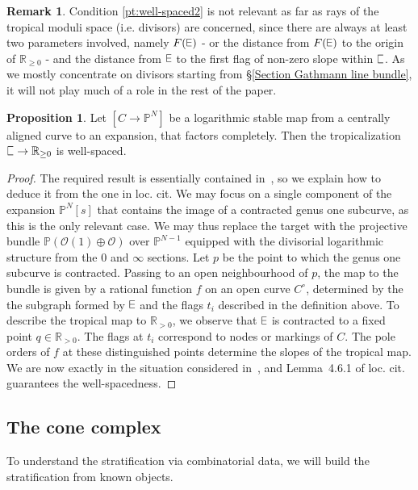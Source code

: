 \documentclass[11pt]{amsart}
\DeclareRobustCommand{\plE}{\text{\reflectbox{$\exists$}}}
\newcommand{\plC}{\scalebox{0.8}[1.3]{$\sqsubset$}}
\renewcommand{\to}{\rightarrow}
\newcommand{\RR}{\mathbb{R}}
\theoremstyle{definition}
\newtheorem{prop}[thm]{Proposition}
\theoremstyle{definition}
\newtheorem*{rem}{Remark}
\begin{document}
\begin{rem}
Condition \eqref{pt:well-spaced2} is not relevant as far as rays of the tropical moduli space (i.e. divisors) are concerned, since there are always at least two parameters involved, namely $F(\plE)$ - or the distance from $F(\plE)$ to the origin of $\RR_{\geq 0}$ - and the distance from $\plE$ to the first flag of non-zero slope within $\plC$. As we mostly concentrate on divisors starting from \S \ref{Section Gathmann line bundle}, it will not play much of a role in the rest of the paper.
\end{rem}

\begin{prop}\label{prop: well-spaced}
Let $[C\to \mathbb P^N]$ be a logarithmic stable map from a centrally aligned curve to an expansion, that factors completely. Then the tropicalization $\plC\to \mathbb R_{\geq 0}$ is well-spaced.
\end{prop}

\begin{proof}
The required result is essentially contained in~\cite[Section 4]{RSPW2}, so we explain how to deduce it from the one in loc. cit. We may focus on a single component of the expansion $\mathbb P^N[s]$ that contains the image of a contracted genus one subcurve, as this is the only relevant case. We may thus replace the target with the projective bundle $\mathbb P(\mathcal O(1)\oplus \mathcal O)$ over $\mathbb P^{N-1}$ equipped with the divisorial logarithmic structure from the $0$ and $\infty$ sections. Let $p$ be the point to which the genus one subcurve is contracted. Passing to an open neighbourhood of $p$, the map to the bundle is given by a rational function $f$ on an open curve $C^\circ$, determined by the the subgraph formed by $\plE$ and the flags $t_i$ described in the definition above. To describe the tropical map to $\mathbb R_{>0}$, we observe that $\plE$ is contracted to a fixed point $q\in\mathbb R_{>0}$. The flags at $t_i$ correspond to nodes or markings of $C$. The pole orders of $f$ at these distinguished points determine the slopes of the tropical map. We are now exactly in the situation considered in~\cite[Second Paragraph of \S~4.6]{RSPW2}, and Lemma~4.6.1 of loc. cit. guarantees the well-spacedness.
\end{proof}

\subsection{The cone complex} To understand the stratification via combinatorial data, we will build the stratification from known objects. \\
\end{document}
